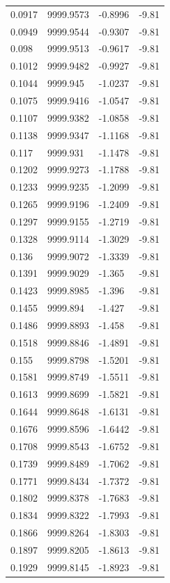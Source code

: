\begin{table}[H]
\begin{tabular}{llll}
0.0917 & 9999.9573 & -0.8996 & -9.81 \\
0.0949 & 9999.9544 & -0.9307 & -9.81 \\
0.098 & 9999.9513 & -0.9617 & -9.81 \\
0.1012 & 9999.9482 & -0.9927 & -9.81 \\
0.1044 & 9999.945 & -1.0237 & -9.81 \\
0.1075 & 9999.9416 & -1.0547 & -9.81 \\
0.1107 & 9999.9382 & -1.0858 & -9.81 \\
0.1138 & 9999.9347 & -1.1168 & -9.81 \\
0.117 & 9999.931 & -1.1478 & -9.81 \\
0.1202 & 9999.9273 & -1.1788 & -9.81 \\
0.1233 & 9999.9235 & -1.2099 & -9.81 \\
0.1265 & 9999.9196 & -1.2409 & -9.81 \\
0.1297 & 9999.9155 & -1.2719 & -9.81 \\
0.1328 & 9999.9114 & -1.3029 & -9.81 \\
0.136 & 9999.9072 & -1.3339 & -9.81 \\
0.1391 & 9999.9029 & -1.365 & -9.81 \\
0.1423 & 9999.8985 & -1.396 & -9.81 \\
0.1455 & 9999.894 & -1.427 & -9.81 \\
0.1486 & 9999.8893 & -1.458 & -9.81 \\
0.1518 & 9999.8846 & -1.4891 & -9.81 \\
0.155 & 9999.8798 & -1.5201 & -9.81 \\
0.1581 & 9999.8749 & -1.5511 & -9.81 \\
0.1613 & 9999.8699 & -1.5821 & -9.81 \\
0.1644 & 9999.8648 & -1.6131 & -9.81 \\
0.1676 & 9999.8596 & -1.6442 & -9.81 \\
0.1708 & 9999.8543 & -1.6752 & -9.81 \\
0.1739 & 9999.8489 & -1.7062 & -9.81 \\
0.1771 & 9999.8434 & -1.7372 & -9.81 \\
0.1802 & 9999.8378 & -1.7683 & -9.81 \\
0.1834 & 9999.8322 & -1.7993 & -9.81 \\
0.1866 & 9999.8264 & -1.8303 & -9.81 \\
0.1897 & 9999.8205 & -1.8613 & -9.81 \\
0.1929 & 9999.8145 & -1.8923 & -9.81 \\

\end{tabular}
\end{table}
